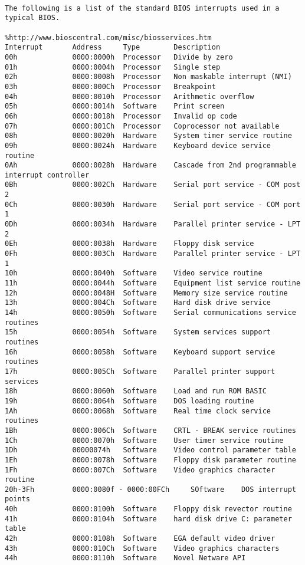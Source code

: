 \documentclass[document.tex]{subfiles}
\begin{document}
\begin{english}


\begin{lstlisting}[label=lst:bootloader_hex,caption=Some Code]

The following is a list of the standard BIOS interrupts used in a typical BIOS.

%http://www.bioscentral.com/misc/biosservices.htm
Interrupt		Address 	Type		Description
00h 			0000:0000h 	Processor 	Divide by zero
01h 			0000:0004h 	Processor 	Single step
02h 			0000:0008h 	Processor 	Non maskable interrupt (NMI)
03h 			0000:000Ch 	Processor 	Breakpoint
04h 			0000:0010h 	Processor 	Arithmetic overflow
05h 			0000:0014h 	Software 	Print screen
06h 			0000:0018h 	Processor 	Invalid op code
07h 			0000:001Ch 	Processor 	Coprocessor not available
08h 			0000:0020h 	Hardware 	System timer service routine
09h 			0000:0024h 	Hardware 	Keyboard device service routine
0Ah 			0000:0028h 	Hardware 	Cascade from 2nd programmable interrupt controller
0Bh 			0000:002Ch 	Hardware 	Serial port service - COM post 2
0Ch 			0000:0030h 	Hardware 	Serial port service - COM port 1
0Dh 			0000:0034h 	Hardware 	Parallel printer service - LPT 2
0Eh 			0000:0038h 	Hardware 	Floppy disk service
0Fh 			0000:003Ch 	Hardware 	Parallel printer service - LPT 1
10h 			0000:0040h 	Software 	Video service routine
11h 			0000:0044h 	Software 	Equipment list service routine
12h 			0000:0048H 	Software 	Memory size service routine
13h 			0000:004Ch 	Software 	Hard disk drive service
14h 			0000:0050h 	Software 	Serial communications service routines
15h 			0000:0054h 	Software 	System services support routines
16h 			0000:0058h 	Software 	Keyboard support service routines
17h 			0000:005Ch 	Software 	Parallel printer support services
18h 			0000:0060h 	Software 	Load and run ROM BASIC
19h 			0000:0064h 	Software 	DOS loading routine
1Ah 			0000:0068h 	Software 	Real time clock service routines
1Bh 			0000:006Ch 	Software 	CRTL - BREAK service routines
1Ch 			0000:0070h 	Software 	User timer service routine
1Dh 			00000074h 	Software 	Video control parameter table
1Eh 			0000:0078h 	Software 	Floppy disk parameter routine
1Fh 			0000:007Ch 	Software 	Video graphics character routine
20h-3Fh 		0000:0080f - 0000:00FCh 	SOftware 	DOS interrupt points
40h 			0000:0100h 	Software 	Floppy disk revector routine
41h 			0000:0104h 	Software 	hard disk drive C: parameter table
42h 			0000:0108h 	Software 	EGA default video driver
43h 			0000:010Ch 	Software 	Video graphics characters
44h 			0000:0110h 	Software 	Novel Netware API

\end{lstlisting}
\end{english}
\end{document}
